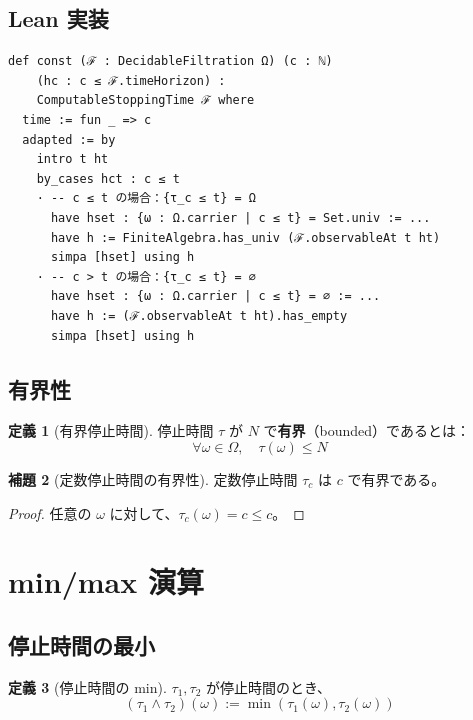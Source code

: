 \documentclass[12pt,a4paper,ja=standard]{bxjsarticle}
\theoremstyle{definition}
\newtheorem{definition}{定義}[section]
\newtheorem{lemma}[definition]{補題}
\begin{document}
\subsection{Lean 実装}

\begin{tcolorbox}[title=Lean コード（93--108 行目）]
\begin{verbatim}
def const (ℱ : DecidableFiltration Ω) (c : ℕ) 
    (hc : c ≤ ℱ.timeHorizon) :
    ComputableStoppingTime ℱ where
  time := fun _ => c
  adapted := by
    intro t ht
    by_cases hct : c ≤ t
    · -- c ≤ t の場合：{τ_c ≤ t} = Ω
      have hset : {ω : Ω.carrier | c ≤ t} = Set.univ := ...
      have h := FiniteAlgebra.has_univ (ℱ.observableAt t ht)
      simpa [hset] using h
    · -- c > t の場合：{τ_c ≤ t} = ∅
      have hset : {ω : Ω.carrier | c ≤ t} = ∅ := ...
      have h := (ℱ.observableAt t ht).has_empty
      simpa [hset] using h
\end{verbatim}
\end{tcolorbox}

\subsection{有界性}

\begin{definition}[有界停止時間]
停止時間 $\tau$ が $N$ で\textbf{有界}（bounded）であるとは：
\[
\forall \omega \in \Omega, \quad \tau(\omega) \leq N
\]
\end{definition}

\begin{lemma}[定数停止時間の有界性]
定数停止時間 $\tau_c$ は $c$ で有界である。
\end{lemma}

\begin{proof}
任意の $\omega$ に対して、$\tau_c(\omega) = c \leq c$。
\end{proof}

\section{min/max 演算}\label{sec:operations}

\subsection{停止時間の最小}

\begin{definition}[停止時間の min]
$\tau_1, \tau_2$ が停止時間のとき、
\[
(\tau_1 \wedge \tau_2)(\omega) := \min(\tau_1(\omega), \tau_2(\omega))
\]
\end{definition}
\end{document}
